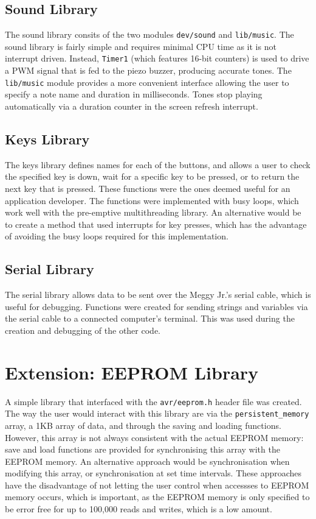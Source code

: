 \documentclass[a4paper,10pt]{article}
\begin{document}
\subsection*{Sound Library}
\label{sub:Sound Library}

The sound library consits of the two modules \texttt{dev/sound} and
\texttt{lib/music}. The sound library is fairly simple and requires minimal
CPU time as it is not interrupt driven. Instead, \texttt{Timer1} (which
features 16-bit counters) is used to drive a PWM signal that is fed to the
piezo buzzer, producing accurate tones. The \texttt{lib/music} module provides
a more convenient interface allowing the user to specify a note name and
duration in milliseconds. Tones stop playing automatically via a duration
counter in the screen refresh interrupt.

\subsection*{Keys Library}
The keys library defines names for each of the buttons, and allows a user to
check the specified key is down, wait for a specific key to be pressed, or to
return the next key that is pressed. These functions were the ones deemed
useful for an application developer.  The functions were implemented with busy
loops, which work well with the pre-emptive multithreading library. An
alternative would be to create a method that used interrupts for key presses,
which has the advantage of avoiding the busy loops required for this
implementation.

\subsection*{Serial Library}
The serial library allows data to be sent over the Meggy Jr.'s serial cable,
which is useful for debugging. Functions were created for sending strings and
variables via the serial cable to a connected computer's terminal. This was
used during the creation and debugging of the other code.

\section*{Extension: EEPROM Library}
A simple library that interfaced with the \texttt{avr/eeprom.h} header file
was created. The way the user would interact with this library are via the
\texttt{persistent\_memory} array, a 1KB array of data, and through the saving
and loading functions. However, this array is not always consistent with the
actual EEPROM memory: save and load functions are provided for synchronising
this array with the EEPROM memory. An alternative approach would be
synchronisation when modifying this array, or synchronisation at set time
intervals. These approaches have the disadvantage of not letting the user
control when accessses to EEPROM memory occurs, which is important, as the
EEPROM memory is only specified to be error free for up to 100,000 reads and
writes, which is a low amount.
\end{document}
